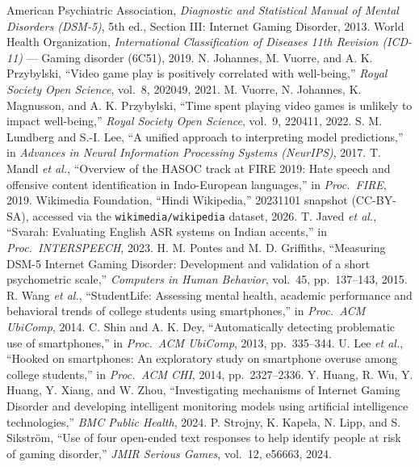  American Psychiatric Association, \emph{Diagnostic and Statistical
Manual of Mental Disorders (DSM-5)}, 5th ed., Section III: Internet Gaming Disorder, 2013.
 World Health Organization, \emph{International Classification of Diseases
11th Revision (ICD-11)} --- Gaming disorder (6C51), 2019.
 N. Johannes, M. Vuorre, and A. K. Przybylski, ``Video game play is
positively correlated with well-being,'' \emph{Royal Society Open Science}, vol.~8, 202049, 2021.
 M. Vuorre, N. Johannes, K. Magnusson, and A. K. Przybylski, ``Time spent
playing video games is unlikely to impact well-being,'' \emph{Royal Society Open Science},
vol.~9, 220411, 2022.
 S. M. Lundberg and S.-I. Lee, ``A unified approach to interpreting
model predictions,'' in \emph{Advances in Neural Information Processing Systems
(NeurIPS)}, 2017.
 T. Mandl \emph{et al.}, ``Overview of the HASOC track at FIRE 2019: Hate speech and offensive
content identification in Indo-European languages,'' in \emph{Proc.\ FIRE}, 2019.
 Wikimedia Foundation, ``Hindi Wikipedia,'' 20231101 snapshot
(CC-BY-SA), accessed via the \texttt{wikimedia/wikipedia} dataset, 2026.
 T. Javed \emph{et al.}, ``Svarah: Evaluating English ASR
systems on Indian accents,'' in \emph{Proc.\ INTERSPEECH}, 2023.
 H. M. Pontes and M. D. Griffiths, ``Measuring DSM-5 Internet Gaming
Disorder: Development and validation of a short psychometric scale,'' \emph{Computers in
Human Behavior}, vol.\ 45, pp.\ 137--143, 2015.
 R. Wang \emph{et al.}, ``StudentLife: Assessing mental health,
academic performance and behavioral trends of college students using smartphones,''
in \emph{Proc.\ ACM UbiComp}, 2014.
 C. Shin and A. K. Dey, ``Automatically detecting problematic use of
smartphones,'' in \emph{Proc.\ ACM UbiComp}, 2013, pp.~335--344.
 U. Lee \emph{et al.}, ``Hooked on smartphones: An exploratory study on
smartphone overuse among college students,'' in \emph{Proc.\ ACM CHI}, 2014, pp.~2327--2336.
 Y. Huang, R. Wu, Y. Huang, Y. Xiang, and W. Zhou,
``Investigating mechanisms of Internet Gaming Disorder and developing intelligent
monitoring models using artificial intelligence technologies,'' \emph{BMC Public
Health}, 2024.
 P. Strojny, K. Kapela, N. Lipp, and S. Sikstr\"om, ``Use of four
open-ended text responses to help identify people at risk of gaming disorder,'' \emph{JMIR
Serious Games}, vol.\ 12, e56663, 2024.
